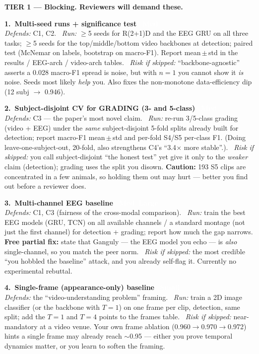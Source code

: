 \documentclass[11pt]{article}
\newcommand{\eff}[2]{\,\colorbox{#1}{\textcolor{white}{\scriptsize\bfseries\,#2\,}}}
\newcommand{\effS}{\eff{effS}{Small}}
\newcommand{\effM}{\eff{effM}{Med}}
\newcommand{\effML}{\eff{effL}{Med--Large}}
\newcommand{\tier}[2]{%
  \vspace{6pt}\par\noindent{\color{#1}\rule{\linewidth}{2.2pt}}\par\vspace{1pt}%
  {\large\bfseries\color{#1} #2}\par\vspace{3pt}}
\newcommand{\dfd}[1]{{\itshape Defends:} #1.\ }
\newcommand{\run}[1]{{\itshape Run:} #1.\ }
\newcommand{\rsk}[1]{{\itshape Risk if skipped:} #1.}
\begin{document}
\tier{t1}{TIER 1 --- Blocking. Reviewers will demand these.}
\begin{checks}
  \item \textbf{1.\ Multi-seed runs + significance test}\ \effM\\
  \dfd{C1, C2}
  \run{$\ge$5 seeds for R(2+1)D and the EEG GRU on all three tasks; $\ge$5 seeds for the top/middle/bottom video backbones at detection; paired test (McNemar on labels, bootstrap on macro-F1). Report mean\,$\pm$\,std in the results / EEG-arch / video-arch tables}
  \rsk{``backbone-agnostic'' asserts a 0.028 macro-F1 spread is noise, but with $n{=}1$ you cannot show it \emph{is} noise. Seeds most likely \emph{help} you. Also fixes the non-monotone data-efficiency dip (12 subj $\to$ 0.946)}

  \item \textbf{2.\ Subject-disjoint CV for GRADING (3- and 5-class)}\ \effM\\
  \dfd{C3 --- the paper's most novel claim}
  \run{re-run 3/5-class grading (video + EEG) under the \emph{same} subject-disjoint 5-fold splits already built for detection; report macro-F1 mean\,$\pm$\,std and per-fold S4/S5 per-class F1. (Doing leave-one-subject-out, 20-fold, also strengthens C4's ``3.4$\times$ more stable''.)}
  \rsk{you call subject-disjoint ``the honest test'' yet give it only to the \emph{weaker} claim (detection); grading uses the split you disown. \textbf{Caution:} 193 S5 clips are concentrated in a few animals, so holding them out may hurt --- better you find out before a reviewer does}

  \item \textbf{3.\ Multi-channel EEG baseline}\ \effML\\
  \dfd{C1, C3 (fairness of the cross-modal comparison)}
  \run{train the best EEG models (GRU, TCN) on all available channels / a standard montage (not just the first channel) for detection + grading; report how much the gap narrows. \textbf{Free partial fix:} state that Ganguly --- the EEG model you echo --- is \emph{also} single-channel, so you match the peer norm}
  \rsk{the most credible ``you hobbled the baseline'' attack, and you already self-flag it. Currently no experimental rebuttal}

  \item \textbf{4.\ Single-frame (appearance-only) baseline}\ \effS\\
  \dfd{the ``video-understanding problem'' framing}
  \run{train a 2D image classifier (or the backbone with $T{=}1$) on one frame per clip, detection, same split; add the $T{=}1$ and $T{=}4$ points to the frames table}
  \rsk{near-mandatory at a video venue. Your own frame ablation (0.960$\to$0.970$\to$0.972) hints a single frame may already reach $\sim$0.95 --- either you prove temporal dynamics matter, or you learn to soften the framing}
\end{checks}
\end{document}
